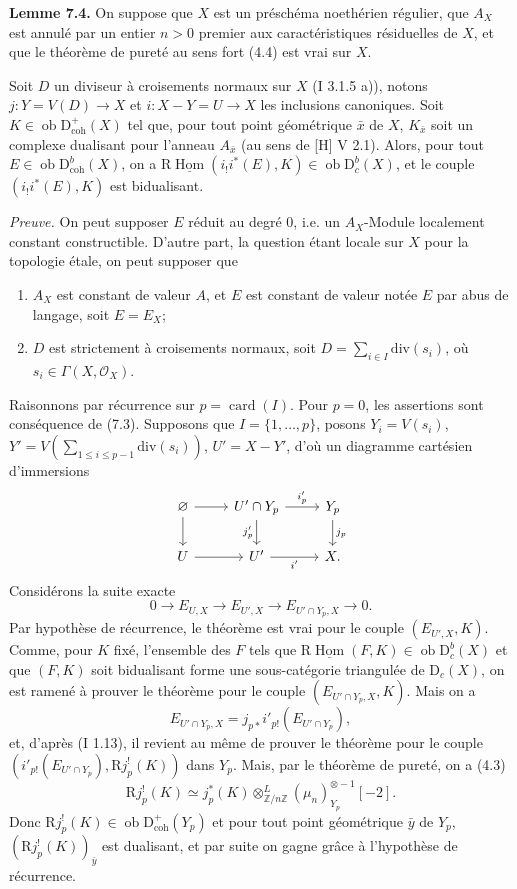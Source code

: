 \documentclass[11pt]{article}
\DeclareMathOperator{\Hom}{Hom}
\newcommand{\R}{\mathrm{R}}
\newcommand{\D}{\mathrm{D}}
\newcommand{\Z}{\mathbb{Z}}
\newcommand{\ob}{\operatorname{ob}}
\providecommand{\Hom}{\operatorname{Hom}}
\providecommand{\ob}{\operatorname{ob}}
\begin{document}
\textbf{Lemme 7.4.} On suppose que $X$ est un préschéma noethérien régulier, que $A_X$ est annulé par un entier $n>0$ premier aux caractéristiques résiduelles de $X$, et que le théorème de pureté au sens fort (4.4) est vrai sur $X$.

Soit $D$ un diviseur à croisements normaux sur $X$ (I 3.1.5 a)), notons $j:Y=V(D)\to X$ et $i:X-Y=U\to X$ les inclusions canoniques. Soit $K\in\ob\D^{+}_{\mathrm{coh}}(X)$ tel que, pour tout point géométrique $\bar{x}$ de $X$, $K_{\bar{x}}$ soit un complexe dualisant pour l'anneau $A_{\bar{x}}$ (au sens de [H] V 2.1). Alors, pour tout $E\in\ob\D^{b}_{\mathrm{coh}}(X)$, on a $\R\underline{\Hom}(i_!i^*(E),K)\in\ob\D^{b}_{c}(X)$, et le couple $(i_!i^*(E),K)$ est bidualisant.

\emph{Preuve.} On peut supposer $E$ réduit au degré $0$, i.e. un $A_X$-Module localement constant constructible. D'autre part, la question étant locale sur $X$ pour la topologie étale, on peut supposer que
\begin{enumerate}[label=(\alph*)]
\item $A_X$ est constant de valeur $A$, et $E$ est constant de valeur notée $E$ par abus de langage, soit $E=E_X$;
\item $D$ est strictement à croisements normaux, soit $D=\sum_{i\in I}\mathrm{div}(s_i)$, où $s_i\in\Gamma(X,\mathcal{O}_X)$.
\end{enumerate}
Raisonnons par récurrence sur $p=\operatorname{card}(I)$. Pour $p=0$, les assertions sont conséquence de (7.3). Supposons que $I=\{1,\ldots,p\}$, posons $Y_i=V(s_i)$, $Y'=V(\sum_{1\leq i\leq p-1}\mathrm{div}(s_i))$, $U'=X-Y'$, d'où un diagramme cartésien d'immersions
\[
\begin{tikzcd}
\varnothing \arrow[r] \arrow[d] & U'\cap Y_p \arrow[r,"i'_p"] \arrow[d,"j'_p"'] & Y_p \arrow[d,"j_p"]\\
U \arrow[r] & U' \arrow[r,"i'"'] & X.
\end{tikzcd}
\]
Considérons la suite exacte
\[
        0\longrightarrow E_{U,X}\longrightarrow E_{U',X}\longrightarrow E_{U'\cap Y_p,X}\longrightarrow0.
\]
Par hypothèse de récurrence, le théorème est vrai pour le couple $(E_{U',X},K)$. Comme, pour $K$ fixé, l'ensemble des $F$ tels que $\R\underline{\Hom}(F,K)\in\ob\D_c^b(X)$ et que $(F,K)$ soit bidualisant forme une sous-catégorie triangulée de $\D_c(X)$, on est ramené à prouver le théorème pour le couple $(E_{U'\cap Y_p,X},K)$. Mais on a
\[
        E_{U'\cap Y_p,X}=j_{p*}i'_{p!}(E_{U'\cap Y_p}),
\]
et, d'après (I 1.13), il revient au même de prouver le théorème pour le couple $(i'_{p!}(E_{U'\cap Y_p}),\R j_p^!(K))$ dans $Y_p$. Mais, par le théorème de pureté, on a (4.3)
\[
        \R j_p^!(K)\simeq j_p^*(K)\otimes^L_{\Z/n\Z}(\mu_n)_{Y_p}^{\otimes -1}[-2].
\]
Donc $\R j_p^!(K)\in\ob\D^{+}_{\mathrm{coh}}(Y_p)$ et pour tout point géométrique $\bar{y}$ de $Y_p$, $(\R j_p^!(K))_{\bar{y}}$ est dualisant, et par suite on gagne grâce à l'hypothèse de récurrence.
\end{document}
